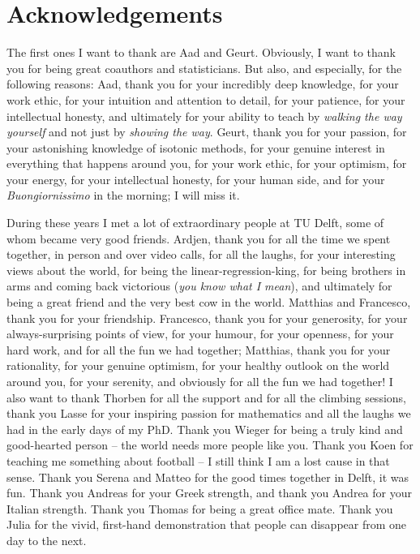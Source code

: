 \chapter{Acknowledgements}
\label{acknowledgements}

The first ones I want to thank are Aad and Geurt. Obviously, I want to thank you for being great coauthors and statisticians. But also, and especially, for the following reasons: Aad, thank you for your incredibly deep knowledge, for your work ethic, for your intuition and attention to detail, for your patience, for your intellectual honesty, and ultimately for your ability to teach by \textit{walking the way yourself} and not just by \textit{showing the way}. Geurt, thank you for your passion, for your astonishing knowledge of isotonic methods, for your genuine interest in everything that happens around you, for your work ethic, for your optimism, for your energy, for your intellectual honesty, for your human side, and for your \textit{Buongiornissimo} in the morning; I will miss it.

During these years I met a lot of extraordinary people at TU Delft, some of whom became very good friends. Ardjen, thank you for all the time we spent together, in person and over video calls, for all the laughs, for your interesting views about the world, for being the linear-regression-king, for being brothers in arms and coming back victorious (\textit{you know what I mean}), and ultimately for being a great friend and the very best cow in the world. Matthias and Francesco, thank you for your friendship. Francesco, thank you for your generosity, for your always-surprising points of view, for your humour, for your openness, for your hard work, and for all the fun we had together; Matthias, thank you for your rationality, for your genuine optimism, for your healthy outlook on the world around you, for your serenity, and obviously for all the fun we had together! I also want to thank Thorben for all the support and for all the climbing sessions, thank you Lasse for your inspiring passion for mathematics and all the laughs we had in the early days of my PhD. Thank you Wieger for being a truly kind and good-hearted person -- the world needs more people like you. Thank you Koen for teaching me something about football -- I still think I am a lost cause in that sense. Thank you Serena and Matteo for the good times together in Delft, it was fun. Thank you Andreas for your Greek strength, and thank you Andrea for your Italian strength. Thank you Thomas for being a great office mate. Thank you Julia for the vivid, first-hand demonstration that people can disappear from one day to the next.

